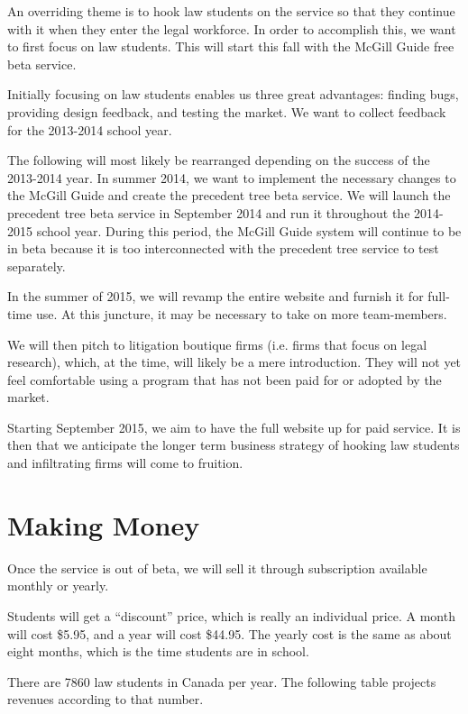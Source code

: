 \documentclass[11pt]{article}
\begin{document}
\break


An overriding theme is to hook law students on the service so that they continue with it when they enter the legal workforce. In order to accomplish this, we want to first focus on law students. This will start this fall with the McGill Guide free beta service.

Initially focusing on law students enables us three great advantages: finding bugs, providing design feedback, and testing the market. We want to collect feedback for the 2013-2014 school year.

The following will most likely be rearranged depending on the success of the 2013-2014 year.
In summer 2014, we want to implement the necessary changes to the McGill Guide and create the precedent tree beta service. We will launch the precedent tree beta service in September 2014 and run it throughout the 2014-2015 school year. During this period, the McGill Guide system will continue to be in beta because it is too interconnected with the precedent tree service to test separately.

In the summer of 2015, we will revamp the entire website and furnish it for full-time use. At this juncture, it may be necessary to take on more team-members.

We will then pitch to litigation boutique firms (i.e. firms that focus on legal research), which, at the time, will likely be a mere introduction. They will not yet feel comfortable using a program that has not been paid for or adopted by the market. 

Starting September 2015, we aim to have the full website up for paid service. It is then that we anticipate the longer term business strategy of hooking law students and infiltrating firms will come to fruition.

\section*{Making Money}

Once the service is out of beta, we will sell it through subscription available monthly or yearly. 

Students will get a ``discount'' price, which is really an individual price. A month will cost \$5.95, and a year will cost \$44.95. The yearly cost is the same as about eight months, which is the time students are in school. 

There are 7860 law students in Canada per year. The following table projects revenues according to that number.
\end{document}
